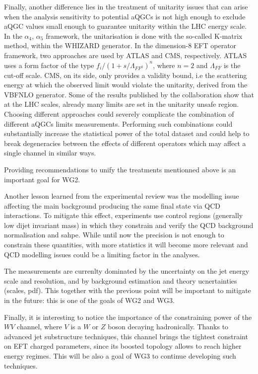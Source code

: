 Finally, another difference lies in the treatment of unitarity issues that can arise when the analysis sensitivity to potential aQGCs is not high enough to exclude aQGC values small enough to guarantee unitarity within the LHC energy scale. In the $\alpha_4$, $\alpha_5$ framework, the unitarisation is done with the so-called K-matrix method, within the WHIZARD generator. In the dimension-8 EFT operator framework, two approaches are used by ATLAS and CMS, respectively. ATLAS uses a form factor of the type $f_i/(1+s/\Lambda_{FF^2})^n$, where $n=2$ and $\Lambda_{FF}$ is the cut-off scale. CMS, on its side, only provides a validity bound, i.e the scattering energy at which the observed limit would violate the unitarity, derived from the VBFNLO generator. Some of the results published by the collaboration show that at the LHC scales, already many limits are set in the unitarity unsafe region. 
Choosing different approaches could severely complicate the combination of different aQGCs limits measurements. Performing such combinations could substantially increase the statistical power of the total dataset and could help to break degeneracies between the effects of different operators which may affect a single channel in similar ways.

Providing recommendations to unify the treatments mentionned above is an important goal for WG2. 

Another lesson learned from the experimental review was the modelling issue affecting the main background producing the same final state via QCD interactions. To mitigate this effect, experiments use control regions (generally low dijet invariant mass) in which they constrain and verify the QCD background normalisation and sahpe. While until now the precision is not enough to constrain these quantities, with more statistics it will become more relevant and QCD modelling issues could be a limiting factor in the analyses.

The measurements are currenlty dominated by the uncertainty on the jet energy scale and resolution, and by background estimation and theory ucnertainties (scales, pdf). This together with the previous point will be important to mitigate in the future: this is one of the goals of WG2 and WG3.
 
Finally, it is interesting to notice the importance of the constraining power of the $WV$ channel, where $V$ is a $W$ or $Z$ boson decaying hadronically. Thanks to advanced jet substructure techniques, this channel brings the tightest constraint on EFT charged parameters, since its boosted topology allows to reach higher energy regimes. This will be also a goal of WG3 to continue developing such techniques. 
